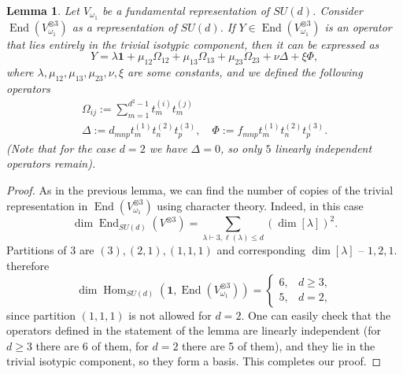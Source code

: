 \documentclass[11pt,letterpaper]{article}
\theoremstyle{plain}
\theoremstyle{plain}
\theoremstyle{plain}
\theoremstyle{plain}
\theoremstyle{plain}
\theoremstyle{plain}
\theoremstyle{plain}
\newtheorem{smlemma}[smtheorem]{Lemma}
\theoremstyle{definition}
\theoremstyle{plain}
\begin{document}
\begin{smlemma}\label{lem:trivial-3site}
    Let $V_{\omega_1}$ be a fundamental representation of $SU(d)$. Consider $\operatorname{End}(V_{\omega_1}^{\otimes 3})$ as a representation of $SU(d)$. 
    If $Y\in \operatorname{End}(V_{\omega_1}^{\otimes 3})$ is an operator that lies entirely in the trivial isotypic component, then it can be expressed as
    \[
        Y=\lambda \mathbf{1}+\mu_{12} \Omega_{12}+\mu_{13} \Omega_{13}+\mu_{23} \Omega_{23}+\nu \Delta+\xi \Phi,
    \]
    where $\lambda, \mu_{12}, \mu_{13}, \mu_{23}, \nu, \xi$ are some constants, and we defined the following operators
    \[
        \begin{gathered}
        \Omega_{i j}:=\sum_{m=1}^{d^2-1} t_m^{(i)} t_m^{(j)} \\
        \Delta:=d_{m n p} t_m^{(1)} t_n^{(2)} t_p^{(3)}, \quad \Phi:=f_{m n p} t_m^{(1)} t_n^{(2)} t_p^{(3)}.
        \end{gathered}
    \]
    (Note that for the case $d=2$ we have $\Delta=0$, so only $5$ linearly independent operators remain).
\end{smlemma}

\begin{proof}
    As in the previous lemma, we can find the number of copies of the trivial representation in $\operatorname{End}(V_{\omega_1}^{\otimes 3})$ using character theory. Indeed, in this case
    \[
        \operatorname{dim} \operatorname{End}_{S U(d)}\left(V^{\otimes 3}\right)=\sum_{\lambda \vdash 3, \ell(\lambda) \leq d}(\operatorname{dim}[\lambda])^2.
    \]
    Partitions of 3 are $(3),(2,1),(1,1,1)$ and corresponding $\operatorname{dim}[\lambda]$ -- $1,2,1$. therefore
    \[
        \operatorname{dim} \operatorname{Hom}_{S U(d)}\left(\mathbf{1}, \operatorname{End}\left(V_{\omega_1}^{\otimes 3}\right)\right)= \begin{cases}6, & d \geq 3, \\ 5, & d=2,\end{cases}
    \]
    since partition $(1,1,1)$ is not allowed for $d=2$. 
    One can easily check that the operators defined in the statement of the lemma are linearly independent (for $d\geq 3$ there are 6 of them, for $d=2$ there are 5 of them), 
    and they lie in the trivial isotypic component, so they form a basis.
    This completes our proof.
\end{proof}
\end{document}

